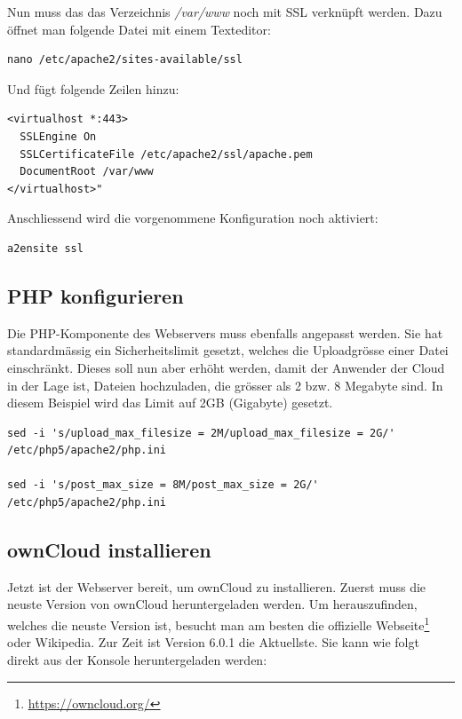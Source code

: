 Nun muss das das Verzeichnis \textit{/var/www} noch mit SSL verknüpft werden. Dazu öffnet man folgende Datei mit einem Texteditor: 

\begin{lstlisting}
nano /etc/apache2/sites-available/ssl
\end{lstlisting}

Und fügt folgende Zeilen hinzu: 

\begin{lstlisting}
<virtualhost *:443>
  SSLEngine On
  SSLCertificateFile /etc/apache2/ssl/apache.pem
  DocumentRoot /var/www  
</virtualhost>" 
\end{lstlisting}

Anschliessend wird die vorgenommene Konfiguration noch aktiviert:

\begin{lstlisting}
a2ensite ssl
\end{lstlisting}

\subsection{PHP konfigurieren}
Die PHP-Komponente des Webservers muss ebenfalls angepasst werden. Sie hat standardmässig ein Sicherheitslimit gesetzt, welches die Uploadgrösse einer Datei einschränkt. Dieses soll nun aber erhöht werden, damit der Anwender der Cloud in der Lage ist, Dateien hochzuladen, die grösser als 2 bzw. 8 Megabyte sind. In diesem Beispiel wird das Limit auf 2GB (Gigabyte) gesetzt.
\\

\begin{lstlisting}
sed -i 's/upload_max_filesize = 2M/upload_max_filesize = 2G/' /etc/php5/apache2/php.ini

sed -i 's/post_max_size = 8M/post_max_size = 2G/' /etc/php5/apache2/php.ini
\end{lstlisting}

\subsection{ownCloud installieren}
Jetzt ist der Webserver bereit, um ownCloud zu installieren. Zuerst muss die neuste Version von ownCloud heruntergeladen werden. Um herauszufinden, welches die neuste Version ist, besucht man am besten die offizielle Webseite\footnote{\url{https://owncloud.org/}} oder Wikipedia. Zur Zeit ist Version 6.0.1 die Aktuellste. Sie kann wie folgt direkt aus der Konsole heruntergeladen werden:

